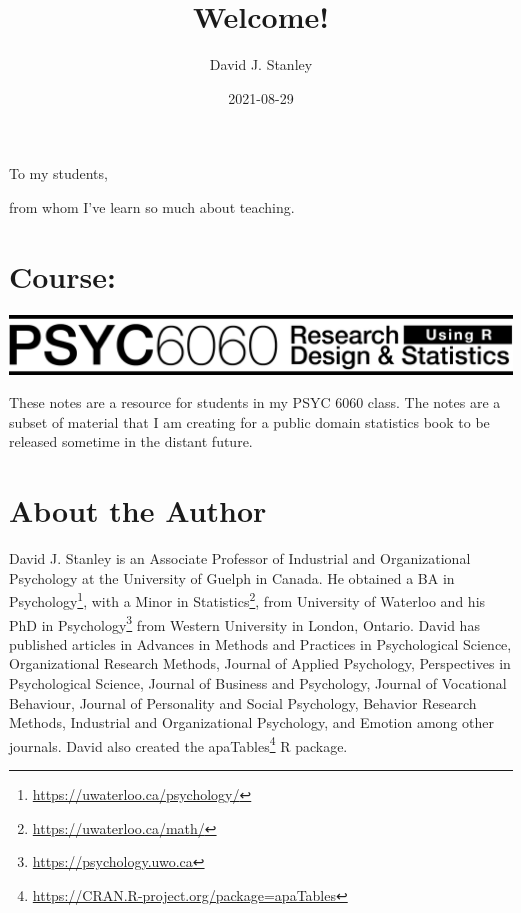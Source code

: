 \documentclass[
]{krantz}
\title{Welcome!}
\author{David J. Stanley}
\date{2021-08-29}
\renewcommand{\href}[2]{#2\footnote{\url{#1}}}
\begin{document}
\maketitle


\thispagestyle{empty}

\begin{center}
To my students,

from whom I've learn so much about teaching.
\end{center}

\setlength{\abovedisplayskip}{-5pt}
\setlength{\abovedisplayshortskip}{-5pt}

{
\hypersetup{linkcolor=}
\setcounter{tocdepth}{2}
\tableofcontents
}
\listoftables
\listoffigures
\hypertarget{course}{%
\chapter*{Course:}\label{course}}


\includegraphics[width=1\linewidth]{header_6060}

These notes are a resource for students in my PSYC 6060 class. The notes are a subset of material that I am creating for a public domain statistics book to be released sometime in the distant future.

\hypertarget{about-the-author}{%
\chapter*{About the Author}\label{about-the-author}}


David J. Stanley is an Associate Professor of Industrial and Organizational Psychology at the University of Guelph in Canada. He obtained a BA in \href{https://uwaterloo.ca/psychology/}{Psychology}, with a Minor in \href{https://uwaterloo.ca/math/}{Statistics}, from University of Waterloo and his PhD in \href{https://psychology.uwo.ca}{Psychology} from Western University in London, Ontario. David has published articles in Advances in Methods and Practices in Psychological Science, Organizational Research Methods, Journal of Applied Psychology, Perspectives in Psychological Science, Journal of Business and Psychology, Journal of Vocational Behaviour, Journal of Personality and Social Psychology, Behavior Research Methods, Industrial and Organizational Psychology, and Emotion among other journals. David also created the \href{https://CRAN.R-project.org/package=apaTables}{apaTables} R package.
\end{document}
